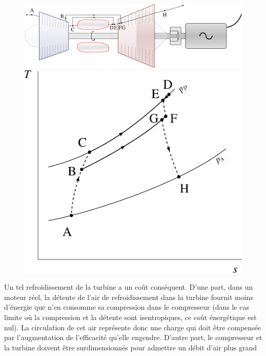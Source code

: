		\begin{figure}
			\begin{center}
				\includegraphics[scale=0.6]{images/circuit_refroidissement_turbine.png}\vspace{0.5cm}
				\includegraphics[scale=0.8]{images/ts_gp_refroidissement_turbine.png}
			\end{center}
			\label{fig_refroidissement_turbine}
		\end{figure}

		Un tel refroidissement de la turbine a un coût conséquent. D’une part, dans un moteur réel, la détente de l’air de refroidissement dans la turbine fournit moins d’énergie que n’en consomme sa compression dans le compresseur (dans le cas limite où la compression et la détente sont isentropiques, ce coût énergétique est nul). La circulation de cet air représente donc une charge qui doit être compensée par l’augmentation de l’efficacité qu’elle engendre. D’autre part, le compresseur et la turbine doivent être surdimensionnés pour admettre un débit d’air plus grand

